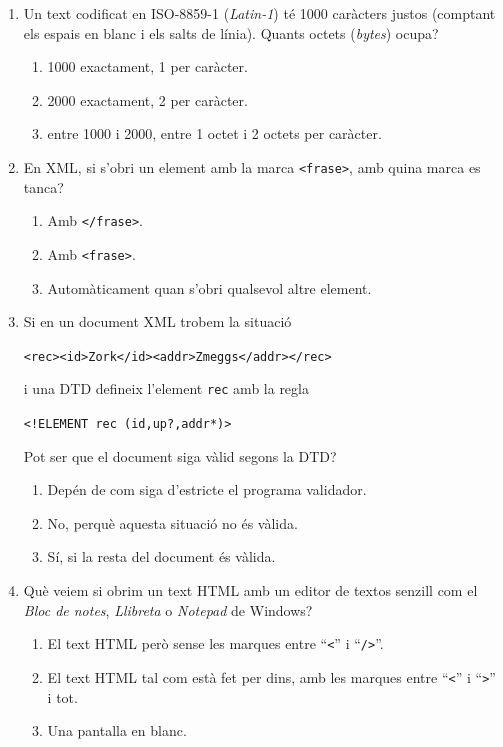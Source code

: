 \begin{enumerate}
\item Un text codificat en ISO-8859-1 (\emph{Latin-1}) té 1000
  caràcters justos (comptant els espais en blanc i els salts de
  línia). Quants octets (\emph{bytes}) ocupa?
  \begin{enumerate}
  \item 1000 exactament, 1 per caràcter.
  \item 2000 exactament, 2 per caràcter.
  \item entre 1000 i 2000, entre 1 octet i 2 octets per caràcter.
  \end{enumerate}

\item En XML, si s'obri un element amb la marca \verb|<frase>|, amb
  quina marca es tanca?
  \begin{enumerate}
  \item Amb \verb|</frase>|.
  \item Amb \verb|<frase>|.
  \item Automàticament quan s'obri qualsevol altre element.
  \end{enumerate}

\item Si en un document XML trobem la situació
  \begin{center}\verb|<rec><id>Zork</id><addr>Zmeggs</addr></rec>|\end{center}
  i una DTD defineix l'element \verb|rec| amb la regla
   \begin{center}\verb|<!ELEMENT rec (id,up?,addr*)>|\end{center} Pot
   ser que el document siga vàlid segons la DTD?
   \begin{enumerate}
   \item Depén de com siga d'estricte el programa validador.
   \item No, perquè aquesta situació no és vàlida.
   \item Sí, si la resta del document és vàlida.
   \end{enumerate}

\item Què veiem si obrim un text HTML amb un editor de textos senzill
  com el \emph{Bloc de notes}, \emph{Llibreta} o \emph{Notepad} de
  Windows?
  \begin{enumerate}
  \item El text HTML però sense les marques entre ``\verb|<|'' i
    ``\verb|/>|''.
  \item El text HTML tal com està fet per dins, amb les marques entre
    ``\verb|<|'' i ``\verb|>|'' i tot.
  \item Una pantalla en blanc.
  \end{enumerate}


\end{enumerate}

